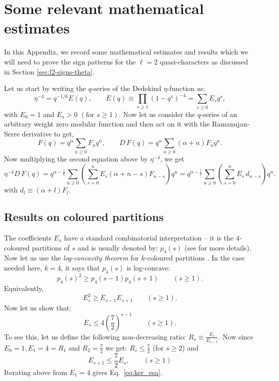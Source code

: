 \documentclass[11pt]{article}
\newcommand\be{\begin{equation}}
\newcommand\ee{\end{equation}}
\begin{document}
\section{Some relevant mathematical estimates}\label{app:estimates_log}

In this Appendix, we record some mathematical estimates and results which we will need to prove the sign patterns for the $\ell=2$ quasi-characters as discussed in Section \ref{sec:l2-signs-theta}.

Let us start by writing the $q$-series of the Dedekind $\eta$-function as:
\begin{equation}
        \eta^{-4}
        =
        q^{-1/6}E(q),
        \qquad
        E(q)
        \equiv
        \prod_{s\ge1}(1-q^s)^{-4}
        =
        \sum_{s\ge0}E_sq^s,
\label{eq:E-kernel-defa}
\end{equation}
with $E_0=1$ and $E_s>0\,\,(\text{for }s\ge1)$. Now let us consider the $q$-series of an arbitrary weight zero modular function and then act on it with the Ramanujan-Serre derivative to get,
\be
        F(q)=q^\alpha\sum_{n\ge0}F_nq^n, \qquad D\,F(q)=q^\alpha\sum_{n\ge0}(\alpha+n)F_nq^n.
\ee
Now multiplying the second equation above by \(\eta^{-4}\), we get
\begin{equation}
\eta^{-4}D\,F(q)
=
q^{\alpha-\frac16}
\sum_{n\ge0}
\left(
\sum_{s=0}^{n}
E_s(\alpha+n-s)F_{n-s}
\right)q^n = q^{\alpha-\frac16}
\sum_{n\ge0}
\left(
\sum_{s=0}^{n}
E_s\,d_{n-s}
\right)q^n.
\label{eq:convolution-formula}
\end{equation}
with $d_l\equiv(\alpha+l)F_l$.

\subsection{Results on coloured partitions}

The coefficients \(E_s\) have a standard combinatorial interpretation -- it is the \(4\)-coloured partitions of \(s\) and is usually denoted by: \(p_4(s)\) (see \cite{BringmannKanePahariRolenStrictLC} for more details). Now let us use the {\it log-concavity theorem} for \(k\)-coloured partitions \cite{BringmannKanePahariRolenStrictLC}. In the case needed
here, \(k=4\), it says that \(p_4(s)\) is log-concave:
\[
        p_4(s)^2\ge p_4(s-1)p_4(s+1)
        \qquad(s\ge1).
\]
Equivalently,
\[
        E_s^2\ge E_{s-1}E_{s+1}
        \qquad(s\ge1).
\]
Now let us show that:
\be\label{eq:ker_esa}
        E_s\le 4\left(\frac72\right)^{s-1}
        \qquad(s\ge1).
\ee
To see this, let us define the following non-decreasing ratio: $R_s\equiv\frac{E_s}{E_{s-1}}$. Now since $E_0=1, E_1 = 4 = R_1$ and $R_2 = \frac72$ we get: $R_s\leq \frac72$ (for $s\geq 2$) and
\be\label{eq:E_ineqa}
    E_{s+1}\leq\frac72 E_s,\qquad  (s\ge 1)
\ee
Iterating above from $E_1 = 4$ gives Eq.~\eqref{eq:ker_esa}.
\end{document}

